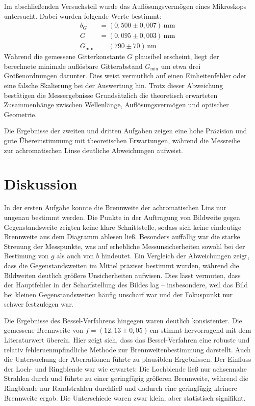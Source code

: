 Im abschließenden Versuchsteil wurde das Auflösungsvermögen eines Mikroskops untersucht. Dabei wurden folgende Werte bestimmt:
\begin{align}
    b_G &= (0{,}500 \pm 0{,}007)\,\mathrm{mm} \\
    G   &= (0{,}095 \pm 0{,}003)\,\mathrm{mm} \\
    G_{\text{min}} &= (790 \pm 70)\,\mathrm{nm}
\end{align}
Während die gemessene Gitterkonstante $G$ plausibel erscheint, liegt der berechnete minimale auflösbare Gitterabstand $G_{\text{min}}$ um etwa drei Größenordnungen darunter. Dies weist vermutlich auf einen Einheitenfehler oder eine falsche Skalierung bei der Auswertung hin. Trotz dieser Abweichung bestätigen die Messergebnisse Grundsätzlich die theoretisch erwarteten Zusammenhänge zwischen Wellenlänge, Auflösungsvermögen und optischer Geometrie.


Die Ergebnisse der zweiten und dritten Aufgaben zeigen eine hohe Präzision und gute Übereinstimmung mit theoretischen Erwartungen, während die Messreihe zur achromatischen Linse deutliche Abweichungen aufweist.

\section{Diskussion}

In der ersten Aufgabe konnte die Brennweite der achromatischen Lins nur ungenau bestimmt werden. Die Punkte in der Auftragung von Bildweite gegen Gegenstandsweite zeigten keine klare Schnittstelle, sodass sich keine eindeutige Brennweite aus dem Diagramm ablesen ließ. Besonders auffällig war die starke Streuung der Messpunkte, was auf erhebliche Messunsicherheiten sowohl bei der Bestimung von $g$ als auch von $b$ hindeutet. Ein Vergleich der Abweichungen zeigt, dass die Gegenstandsweiten im Mittel präziser bestimmt wurden, während die Bildweiten deutlich größere Unsicherheiten aufwisen. Dies lässt vermuten, dass der Hauptfehler in der Scharfstellung des Bildes lag – insbesondere, weil das Bild bei kleinen Gegenstandsweiten häufig unscharf war und der Fokuspunkt nur schwer festzulegen war.

Die Ergebnisse des Bessel-Verfahrens hingegen waren deutlich konsistenter. Die gemessene Brennweite von $f = (12{,}13 \pm 0{,}05)\,\mathrm{cm}$ stimmt hervorragend mit dem Literaturwert überein. Hier zeigt sich, dass das Bessel-Verfahren eine robuste und relativ fehleruenmpfindliche Methode zur Brennweitenbestimmung darstellt. Auch die Untersuchung der Aberrationen führte zu plausiblen Ergebnissen. Der Einfluss der Loch- und Ringblende war wie erwartet: Die Lochblende ließ nur achsennahe Strahlen durch und führte zu einer geringfügig größeren Brennweite, während die Ringblende nur Randstrahlen durchließ und dadurch eine geringfügig kleinere Brennweite ergab. Die Unterschiede waren zwar klein, aber statistisch signifiknt.

